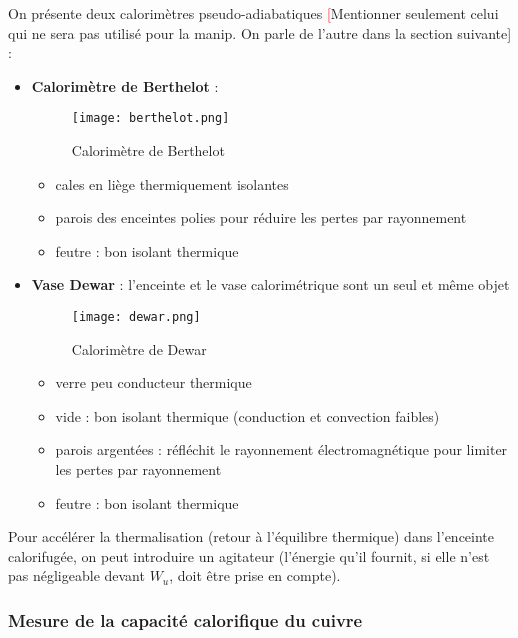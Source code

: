 \documentclass[11pt,a4paper]{report}
\begin{document}
On présente deux calorimètres pseudo-adiabatiques \textcolor{red}[Mentionner seulement celui qui ne sera pas utilisé pour la manip. On parle de l'autre dans la section suivante] :
\begin{itemize}
	\item \textbf{Calorimètre de Berthelot} :
	
		\begin{figure}[h!]
		\begin{center}
			\texttt{[image: berthelot.png]}
			\caption{Calorimètre de Berthelot} 
			\label{fig:berthelot}
		\end{center}
		\end{figure}
		\begin{itemize}
			\item cales en liège thermiquement isolantes
			\item parois des enceintes polies pour réduire les pertes par rayonnement
			\item feutre : bon isolant thermique\\
		\end{itemize}
		
	\item \textbf{Vase Dewar} : l'enceinte et le vase calorimétrique sont un seul et même objet
	
		\begin{figure}[h!]
		\begin{center}
			\texttt{[image: dewar.png]}
			\caption{Calorimètre de Dewar} 
			\label{fig:dewar}
		\end{center}
		\end{figure}
		\begin{itemize}
			\item verre peu conducteur thermique
			\item vide : bon isolant thermique (conduction et convection faibles)
			\item parois argentées : réfléchit le rayonnement électromagnétique pour limiter les pertes par rayonnement
			\item feutre : bon isolant thermique
		\end{itemize}
\end{itemize}

Pour accélérer la thermalisation (retour à l'équilibre thermique) dans l'enceinte calorifugée, on peut introduire un agitateur (l'énergie qu'il fournit, si elle n'est pas négligeable devant $W_u$, doit être prise en compte).

\subsubsection{Mesure de la capacité calorifique du cuivre}
\end{document}
